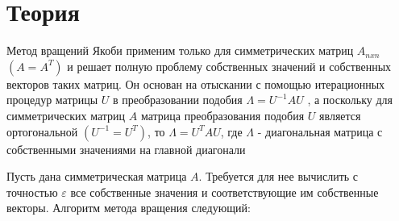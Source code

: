 \section*{Теория}

Метод вращений Якоби применим только для симметрических
матриц $A_{nxn}$ $(A = A^T)$ и решает полную проблему собственных
значений и собственных векторов
таких матриц. Он основан на отыскании с помощью итерационных
процедур матрицы $U$ в преобразовании подобия $\Lambda = U^{-1}AU$ , а
поскольку для симметрических матриц $A$
матрица преобразования подобия $U$ является ортогональной 
$(U^{-1} = U^T)$, то $\Lambda = U^T AU$, где $\Lambda$ - диагональная 
матрица с собственными значениями на главной диагонали

Пусть дана симметрическая матрица $A$. Требуется для нее вычислить с
точностью $\varepsilon$ все собственные значения и соответствующие им собственные
векторы. Алгоритм метода вращения следующий:


